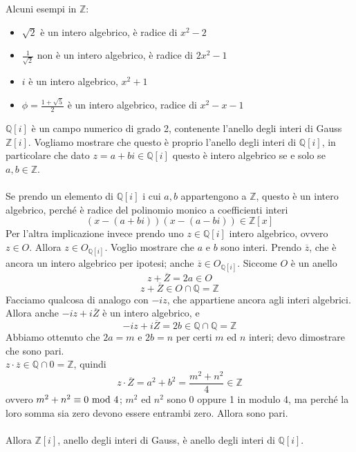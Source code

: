 \begin{esempio}
	Alcuni esempi in $\mathbb{Z}$:
	\begin{itemize}
		\item $\sqrt{2}$ è un intero algebrico, è radice di $x^2-2$
		\item $\frac{1}{\sqrt{2}}$ non è un intero algebrico, è radice di $2x^2-1$
		\item $i$ è un intero algebrico, $x^2+1$
		\item $\phi=\frac{1+\sqrt{5}}{2}$ è un intero algebrico, radice di $x^2-x-1$
	\end{itemize}
\end{esempio}
\begin{esempio}
	$\mathbb{Q}[i]$ è un campo numerico di grado 2, contenente l'anello degli interi di Gauss $\mathbb{Z}[i]$. Vogliamo mostrare che questo è proprio l'anello degli interi di $\mathbb{Q}[i]$, in particolare che dato $z=a+bi\in\mathbb{Q}[i]$ questo è intero algebrico se e solo se $a,b\in\mathbb{Z}$. \\ \\
	Se prendo un elemento di $\mathbb{Q}[i]$ i cui $a,b$ appartengono a $\mathbb{Z}$, questo è un intero algebrico, perché è radice del polinomio monico a coefficienti interi
	\begin{equation*}
	\left(x-(a+bi)\right)\left(x-(a-bi)\right)\in\mathbb{Z}[x]
	\end{equation*}
	Per l'altra implicazione invece prendo uno $z\in\mathbb{Q}[i]$ intero algebrico, ovvero $z\in O$. Allora $z\in O_{\mathbb{Q}[i]}$. Voglio mostrare che $a$ e $b$ sono interi. Prendo $\overline{z}$, che è ancora un intero algebrico per ipotesi; anche $\overline{z}\in O_{\mathbb{Q}[i]}$. Siccome $O$ è un anello
	\begin{equation*}
	z+\overline{Z}=2a\in O
	\end{equation*}
	\begin{equation*}
	z+\overline{Z}\in O \cap \mathbb{Q} = \mathbb{Z}
	\end{equation*}
	Facciamo qualcosa di analogo con $-iz$, che appartiene ancora agli interi algebrici. Allora anche $-iz+i\overline{Z}$ è un intero algebrico, e 
	\begin{equation*}
	-iz+i\overline{Z}=2b \in \mathbb{Q}\cap\mathbb{Q}=\mathbb{Z}
	\end{equation*}
	Abbiamo ottenuto che $2a=m$ e $2b=n$ per certi $m$ ed $n$ interi; devo dimostrare che sono pari. \\ $z\cdot\overline{z}\in\mathbb{Q}\cap 0 =\mathbb{Z}$, quindi
	\begin{equation*}
	z\cdot\overline{Z}=a^2+b^2=\frac{m^2+n^2}{4}\in\mathbb{Z}
	\end{equation*}
	ovvero $m^2+n^2\equiv0\ \mathrm{mod}\ 4$; $m^2$ ed $n^2$ sono 0 oppure 1 in modulo 4, ma perché la loro somma sia zero devono essere entrambi zero. Allora sono pari. \\ \\ Allora $\mathbb{Z}[i]$, anello degli interi di Gauss, è anello degli interi di $\mathbb{Q}[i]$.
\end{esempio}
